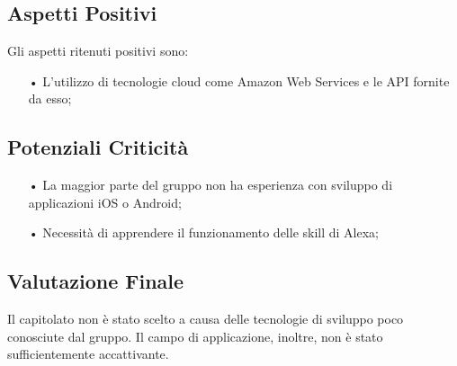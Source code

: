 \subsection{Aspetti Positivi}
Gli aspetti ritenuti positivi sono:
\begin{itemize}
\item[•] L'utilizzo di tecnologie cloud come Amazon Web Services e le API fornite da esso;
\end{itemize}

\subsection{Potenziali Criticità}
\begin{itemize}
\item[•] La maggior parte del gruppo non ha esperienza con sviluppo di applicazioni iOS o Android;
\item[•] Necessità di apprendere il funzionamento delle skill di Alexa;
\end{itemize}

\subsection{Valutazione Finale}
Il capitolato non è stato scelto a causa delle tecnologie di sviluppo poco conosciute dal gruppo. Il campo di applicazione, inoltre, non è stato sufficientemente accattivante.
